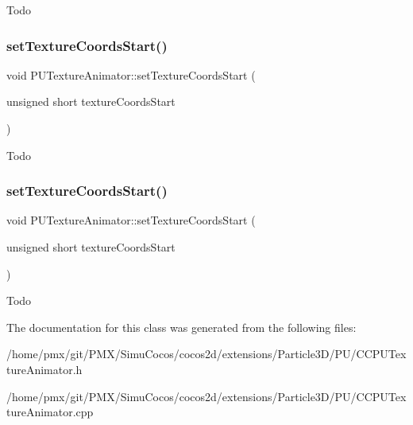 Todo \mbox{\label{classPUTextureAnimator_a6a36ac552c18aec4bba640b9c75c0cd3}} 
\subsubsection{\texorpdfstring{set\+Texture\+Coords\+Start()}{setTextureCoordsStart()}\hspace{0.1cm}{\footnotesize\ttfamily [1/2]}}
{\footnotesize\ttfamily void P\+U\+Texture\+Animator\+::set\+Texture\+Coords\+Start (\begin{DoxyParamCaption}\item[{unsigned short}]{texture\+Coords\+Start }\end{DoxyParamCaption})}

Todo \mbox{\label{classPUTextureAnimator_a6a36ac552c18aec4bba640b9c75c0cd3}} 
\subsubsection{\texorpdfstring{set\+Texture\+Coords\+Start()}{setTextureCoordsStart()}\hspace{0.1cm}{\footnotesize\ttfamily [2/2]}}
{\footnotesize\ttfamily void P\+U\+Texture\+Animator\+::set\+Texture\+Coords\+Start (\begin{DoxyParamCaption}\item[{unsigned short}]{texture\+Coords\+Start }\end{DoxyParamCaption})}

Todo 

The documentation for this class was generated from the following files\+:\begin{DoxyCompactItemize}
\item 
/home/pmx/git/\+P\+M\+X/\+Simu\+Cocos/cocos2d/extensions/\+Particle3\+D/\+P\+U/C\+C\+P\+U\+Texture\+Animator.\+h\item 
/home/pmx/git/\+P\+M\+X/\+Simu\+Cocos/cocos2d/extensions/\+Particle3\+D/\+P\+U/C\+C\+P\+U\+Texture\+Animator.\+cpp\end{DoxyCompactItemize}
